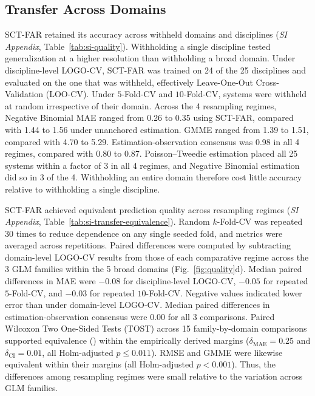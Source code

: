 \documentclass{article}
\begin{document}
\subsection*{Transfer Across Domains}
\label{sub-sec:transfer}
SCT-FAR retained its accuracy across withheld domains and disciplines (\textit{SI Appendix}, Table~\ref{tab:si-quality}). Withholding a single discipline tested generalization at a higher resolution than withholding a broad domain. Under discipline-level LOGO-CV, SCT-FAR was trained on 24 of the 25 disciplines and evaluated on the one that was withheld, effectively Leave-One-Out Cross-Validation (LOO-CV). Under $5$-Fold-CV and $10$-Fold-CV, systems were withheld at random irrespective of their domain. Across the 4 resampling regimes, Negative Binomial MAE ranged from 0.26 to 0.35 using SCT-FAR, compared with 1.44 to 1.56 under unanchored estimation. GMME ranged from 1.39 to 1.51, compared with 4.70 to 5.29. Estimation-observation consensus was 0.98 in all 4 regimes, compared with 0.80 to 0.87. Poisson--Tweedie estimation placed all 25 systems within a factor of 3 in all 4 regimes, and Negative Binomial estimation did so in 3 of the 4. Withholding an entire domain therefore cost little accuracy relative to withholding a single discipline.

SCT-FAR achieved equivalent prediction quality across resampling regimes (\textit{SI Appendix}, Table~\ref{tab:si-transfer-equivalence}). Random $k$-Fold-CV was repeated 30 times to reduce dependence on any single seeded fold, and metrics were averaged across repetitions. Paired differences were computed by subtracting domain-level LOGO-CV results from those of each comparative regime across the 3 GLM families within the 5 broad domains (Fig.~\ref{fig:quality}d). Median paired differences in MAE were $-0.08$ for discipline-level LOGO-CV, $-0.05$ for repeated $5$-Fold-CV, and $-0.03$ for repeated $10$-Fold-CV. Negative values indicated lower error than under domain-level LOGO-CV. Median paired differences in estimation-observation consensus were 0.00 for all 3 comparisons. Paired Wilcoxon Two One-Sided Tests (TOST) across 15 family-by-domain comparisons supported equivalence () within the empirically derived margins ($\delta_{\mathrm{MAE}} = 0.25$ and $\delta_{\mathrm{CI}} = 0.01$, all Holm-adjusted $p \leq 0.011$). RMSE and GMME were likewise equivalent within their margins (all Holm-adjusted $p < 0.001$). Thus, the differences among resampling regimes were small relative to the variation across GLM families.
\end{document}
